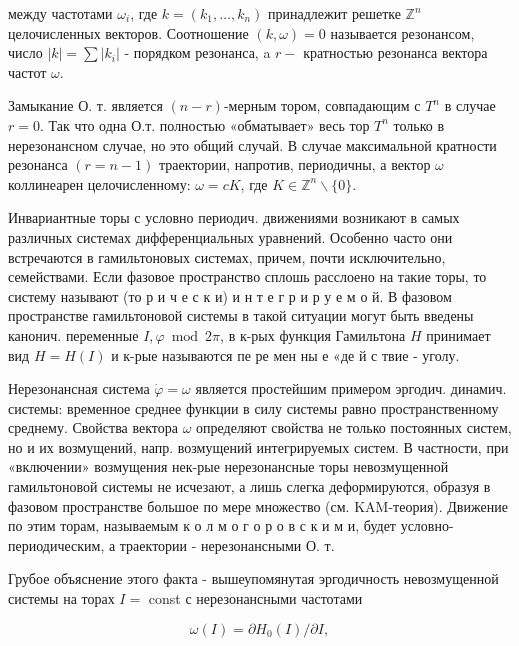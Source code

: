 \documentclass[10pt]{article}
\begin{document}
между частотами $\omega_{i}$, где $k=\left(k_{1}, \ldots, k_{n}\right)$ принадлежит решетке $\mathbb{Z}^{n}$ целочисленных векторов. Соотношение $(k, \omega)=0$ называется резонансом, число $|k|=\sum\left|k_{i}\right|$ - порядком резонанса, a $r-$ кратностью резонанса вектора частот $\omega$.



Замыкание О. т. является $(n-r)$-мерным тором, совпадающим с $T^{n}$ в случае $r=0$. Так что одна О.т. полностью «обматывает» весь тор $T^{n}$ только в нерезонансном случае, но это общий случай. В случае максимальной кратности резонанса $(r=n-1)$ траектории, напротив, периодичны, а вектор $\omega$ коллинеарен целочисленному: $\omega=c K$, где $K \in \mathbb{Z}^{n} \backslash\{0\}$.



Инвариантные торы с условно периодич. движениями возникают в самых различных системах дифференциальных уравнений. Особенно часто они встречаются в гамильтоновых системах, причем, почти исключительно, семействами. Если фазовое пространство сплошь расслоено на такие торы, то систему называют (то р и ч е с к и) и н т е г р и р у е м о й. В фазовом пространстве гамильтоновой системы в такой ситуации могут быть введены канонич. переменные $I, \varphi \bmod 2 \pi$, в к-рых функция Гамильтона $H$ принимает вид $H=H(I)$ и к-рые называются пе ре мен ны е «де й с твие - уголу.



Нерезонансная система $\dot{\varphi}=\omega$ является простейшим примером эргодич. динамич. системы: временное среднее функции в силу системы равно пространственному среднему. Свойства вектора $\omega$ определяют свойства не только постоянных систем, но и их возмущений, напр. возмущений интегрируемых систем. В частности, при «включении» возмущения нек-рые нерезонансные торы невозмущенной гамильтоновой системы не исчезают, а лишь слегка деформируются, образуя в фазовом пространстве большое по мере множество (см. KAM-теория). Движение по этим торам, называемым к о л м о г о р о в с к и м и, будет условно-периодическим, а траектории - нерезонансными О. т.



Грубое объяснение этого факта - вышеупомянутая эргодичность невозмущенной системы на торах $I=$ const с нерезонансными частотами



\[

\omega(I)=\partial H_{0}(I) / \partial I,

\]
\end{document}
